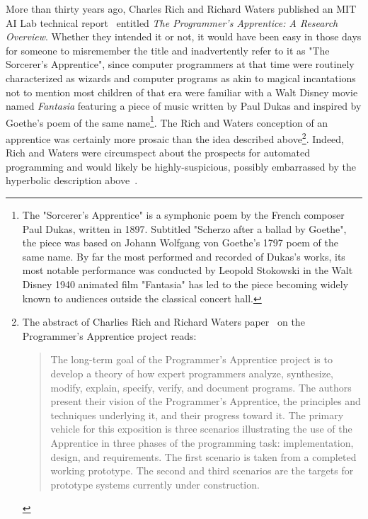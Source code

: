 More than thirty years ago, Charles Rich and Richard Waters published an MIT AI Lab technical report~\cite{RichandWatersAIM-87} entitled {\it{The Programmer's Apprentice: A Research Overview}}. Whether they intended it or not, it would have been easy in those days for someone to misremember the title and inadvertently refer to it as "The Sorcerer's Apprentice", since computer programmers at that time were routinely characterized as wizards and computer programs as akin to magical incantations \emdash{} not to mention most children of that era were familiar with a Walt Disney movie named {\it{Fantasia}} featuring a piece of music written by Paul Dukas and inspired by Goethe's poem of the same name\footnote{%
%
  The "Sorcerer's Apprentice" is a symphonic poem by the French composer Paul Dukas, written in 1897. Subtitled "Scherzo after a ballad by Goethe", the piece was based on Johann Wolfgang von Goethe's 1797 poem of the same name. By far the most performed and recorded of Dukas's works, its most notable performance was conducted by Leopold Stokowski in the Walt Disney 1940 animated film "Fantasia" has led to the piece becoming widely known to audiences outside the classical concert hall. {}}.
%
The Rich and Waters conception of an apprentice was certainly more prosaic than the idea described above\footnote{%
%
  The abstract of Charlies Rich and Richard Waters paper~\cite{RichandWatersAIM-87} on the Programmer's Apprentice project reads:
%
  \begin{quotation}
%
    The long-term goal of the Programmer's Apprentice project is to develop a theory of how expert programmers analyze, synthesize, modify, explain, specify, verify, and document programs. The authors present their vision of the Programmer's Apprentice, the principles and techniques underlying it, and their progress toward it. The primary vehicle for this exposition is three scenarios illustrating the use of the Apprentice in three phases of the programming task: implementation, design, and requirements. The first scenario is taken from a completed working prototype. The second and third scenarios are the targets for prototype systems currently under construction.
%
  \end{quotation}}.
%
Indeed, Rich and Waters were circumspect about the prospects for automated programming and would likely be highly-suspicious, possibly embarrassed by the hyperbolic description above~\cite{RichandWatersCOMPUTER-88}.

